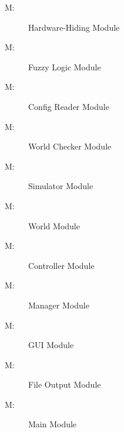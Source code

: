 \documentclass[12pt, titlepage]{article}
\newcounter{mnum}
\newcommand{\mthemnum}{M\themnum}
\begin{document}
\begin{description}
\item [ \mthemnum \label{mHH}:] Hardware-Hiding Module
\item [ \mthemnum \label{mFuzzyLogic}:] Fuzzy Logic Module
\item [ \mthemnum \label{mConfigReader}:] Config Reader Module
\item [ \mthemnum \label{mWorldChecker}:] World Checker Module
\item [ \mthemnum \label{mSimulator}:] Simulator Module
\item [ \mthemnum \label{mWorld}:] World Module
\item [ \mthemnum \label{mController}:] Controller Module
\item [ \mthemnum \label{mManager}:] Manager Module
\item [ \mthemnum \label{mGUI}:] GUI Module
\item [ \mthemnum \label{mFileOutput}:] File Output Module
\item [ \mthemnum \label{mMain}:] Main Module
\end{description}
\end{document}
